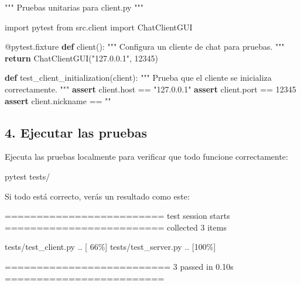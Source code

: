 \documentclass[
  a4paper,
  DIV=11,
  numbers=noendperiod,
  onepage,
  openany]{scrreprt}
\newenvironment{Shaded}{\begin{snugshade}}{\end{snugshade}}
\newcommand{\AttributeTok}[1]{\textcolor[rgb]{0.40,0.45,0.13}{#1}}
\newcommand{\CommentTok}[1]{\textcolor[rgb]{0.37,0.37,0.37}{#1}}
\newcommand{\ControlFlowTok}[1]{\textcolor[rgb]{0.00,0.23,0.31}{\textbf{#1}}}
\newcommand{\DecValTok}[1]{\textcolor[rgb]{0.68,0.00,0.00}{#1}}
\newcommand{\ExtensionTok}[1]{\textcolor[rgb]{0.00,0.23,0.31}{#1}}
\newcommand{\ImportTok}[1]{\textcolor[rgb]{0.00,0.46,0.62}{#1}}
\newcommand{\KeywordTok}[1]{\textcolor[rgb]{0.00,0.23,0.31}{\textbf{#1}}}
\newcommand{\NormalTok}[1]{\textcolor[rgb]{0.00,0.23,0.31}{#1}}
\newcommand{\OperatorTok}[1]{\textcolor[rgb]{0.37,0.37,0.37}{#1}}
\newcommand{\StringTok}[1]{\textcolor[rgb]{0.13,0.47,0.30}{#1}}
\begin{document}
\begin{Shaded}
\begin{Highlighting}[]
\CommentTok{"""}
\CommentTok{Pruebas unitarias para client.py}
\CommentTok{"""}

\ImportTok{import}\NormalTok{ pytest}
\ImportTok{from}\NormalTok{ src.client }\ImportTok{import}\NormalTok{ ChatClientGUI}


\AttributeTok{@pytest.fixture}
\KeywordTok{def}\NormalTok{ client():}
    \CommentTok{"""}
\CommentTok{    Configura un cliente de chat para pruebas.}
\CommentTok{    """}
    \ControlFlowTok{return}\NormalTok{ ChatClientGUI(}\StringTok{"127.0.0.1"}\NormalTok{, }\DecValTok{12345}\NormalTok{)}


\KeywordTok{def}\NormalTok{ test\_client\_initialization(client):}
    \CommentTok{"""}
\CommentTok{    Prueba que el cliente se inicializa correctamente.}
\CommentTok{    """}
    \ControlFlowTok{assert}\NormalTok{ client.host }\OperatorTok{==} \StringTok{"127.0.0.1"}
    \ControlFlowTok{assert}\NormalTok{ client.port }\OperatorTok{==} \DecValTok{12345}
    \ControlFlowTok{assert}\NormalTok{ client.nickname }\OperatorTok{==} \StringTok{""}
\end{Highlighting}
\end{Shaded}

\subsection{4. Ejecutar las pruebas}\label{ejecutar-las-pruebas-1}

Ejecuta las pruebas localmente para verificar que todo funcione
correctamente:

\begin{Shaded}
\begin{Highlighting}[]
\ExtensionTok{pytest}\NormalTok{ tests/}
\end{Highlighting}
\end{Shaded}

Si todo está correcto, verás un resultado como este:

\begin{Shaded}
\begin{Highlighting}[]
\NormalTok{========================= test session starts =========================}
\NormalTok{collected 3 items}

\NormalTok{tests/test\_client.py ..                                           [ 66\%]}
\NormalTok{tests/test\_server.py ..                                           [100\%]}

\NormalTok{========================== 3 passed in 0.10s =========================}
\end{Highlighting}
\end{Shaded}
\end{document}
